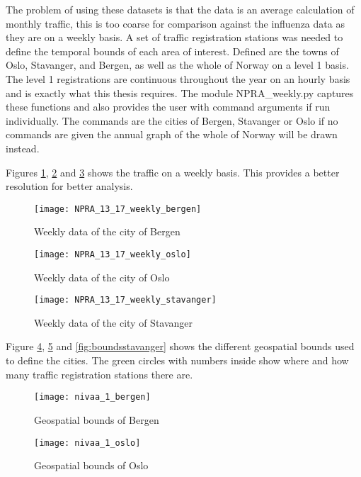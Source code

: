 The problem of using these datasets is that the data is an average calculation of monthly traffic, this is too coarse for comparison against the influenza data as they are on a weekly basis. A set of traffic registration stations was needed to define the temporal bounds of each area of interest. Defined are the towns of Oslo, Stavanger, and Bergen, as well as the whole of Norway on a level 1 basis. The level 1 registrations are continuous throughout the year on an hourly basis and is exactly what this thesis requires. The module NPRA\_weekly.py captures these functions and also provides the user with command arguments if run individually. The commands are the cities of Bergen, Stavanger or Oslo if no commands are given the annual graph of the whole of Norway will be drawn instead.

Figures \ref{fig:weeklybergen}, \ref{fig:weeklyoslo} and \ref{fig:weeklystavanger} shows the traffic on a weekly basis. This provides a better resolution for better analysis.
\begin{figure}[ht]
\texttt{[image: NPRA\_13\_17\_weekly\_bergen]}
\centering
\caption{Weekly data of the city of Bergen}
\label{fig:weeklybergen}
\end{figure}

\begin{figure}[ht]
\texttt{[image: NPRA\_13\_17\_weekly\_oslo]}
\centering
\caption{Weekly data of the city of Oslo}
\label{fig:weeklyoslo}
\end{figure}

\begin{figure}[ht]
\texttt{[image: NPRA\_13\_17\_weekly\_stavanger]}
\centering
\caption{Weekly data of the city of Stavanger}
\label{fig:weeklystavanger}
\end{figure}

Figure \ref{fig:boundsbergen}, \ref{fig:boundsoslo} and \ref{fig:boundsstavanger} shows the different geospatial bounds used to define the cities. The green circles with numbers inside show where and how many traffic registration stations there are.

\begin{figure}[ht]
\texttt{[image: nivaa\_1\_bergen]}
\centering
\caption{Geospatial bounds of Bergen}
\label{fig:boundsbergen}
\end{figure}

\begin{figure}[ht]
\texttt{[image: nivaa\_1\_oslo]}
\centering
\caption{Geospatial bounds of Oslo}
\label{fig:boundsoslo}
\end{figure}


